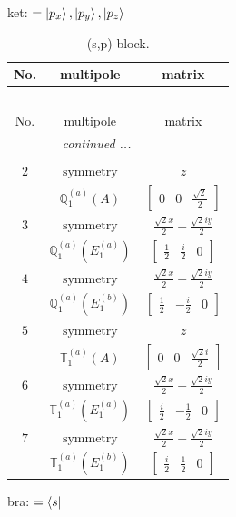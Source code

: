 \documentclass[fleqn,8pt,landscape]{jsarticle}
\begin{document}
\noindent
ket: $=\ket{p_{x}}, \ket{p_{y}}, \ket{p_{z}}$
\renewcommand{\arraystretch}{1.6}
\begin{longtable}{ccc}
\caption{(s,p) block.}
 \\
 \hline \hline
No. & multipole & matrix \\ \hline \endfirsthead

\multicolumn{2}{l}{\tablename\ \thetable{}} \\
 \hline \hline
No. & multipole & matrix \\ \hline \endhead

 \hline \hline
\multicolumn{2}{r}{\footnotesize\it continued ...} \\ \endfoot

 \hline \hline
\multicolumn{2}{r}{} \\ \endlastfoot

$ 2 $ & $ \text{symmetry} $ & $ z $ \\
$  $ & $ \mathbb{Q}_{1}^{(a)}(A) $ & $ \begin{bmatrix} 0 & 0 & \frac{\sqrt{2}}{2} \end{bmatrix} $ \\ \hline
$ 3 $ & $ \text{symmetry} $ & $ \frac{\sqrt{2} x}{2} + \frac{\sqrt{2} i y}{2} $ \\
$  $ & $ \mathbb{Q}_{1}^{(a)}(E_{1}^{(a)}) $ & $ \begin{bmatrix} \frac{1}{2} & \frac{i}{2} & 0 \end{bmatrix} $ \\ \hline
$ 4 $ & $ \text{symmetry} $ & $ \frac{\sqrt{2} x}{2} - \frac{\sqrt{2} i y}{2} $ \\
$  $ & $ \mathbb{Q}_{1}^{(a)}(E_{1}^{(b)}) $ & $ \begin{bmatrix} \frac{1}{2} & - \frac{i}{2} & 0 \end{bmatrix} $ \\ \hline
$ 5 $ & $ \text{symmetry} $ & $ z $ \\
$  $ & $ \mathbb{T}_{1}^{(a)}(A) $ & $ \begin{bmatrix} 0 & 0 & \frac{\sqrt{2} i}{2} \end{bmatrix} $ \\ \hline
$ 6 $ & $ \text{symmetry} $ & $ \frac{\sqrt{2} x}{2} + \frac{\sqrt{2} i y}{2} $ \\
$  $ & $ \mathbb{T}_{1}^{(a)}(E_{1}^{(a)}) $ & $ \begin{bmatrix} \frac{i}{2} & - \frac{1}{2} & 0 \end{bmatrix} $ \\ \hline
$ 7 $ & $ \text{symmetry} $ & $ \frac{\sqrt{2} x}{2} - \frac{\sqrt{2} i y}{2} $ \\
$  $ & $ \mathbb{T}_{1}^{(a)}(E_{1}^{(b)}) $ & $ \begin{bmatrix} \frac{i}{2} & \frac{1}{2} & 0 \end{bmatrix} $ \\ \hline
\end{longtable}
bra: $=\bra{s}$
\end{document}
